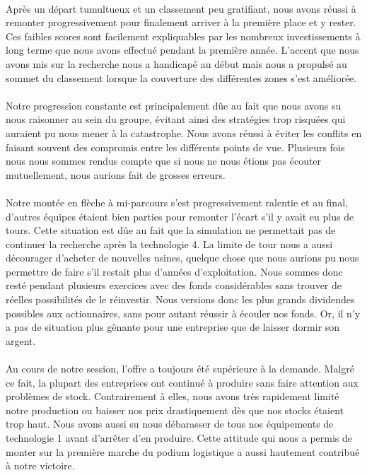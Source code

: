 \paragraph{}
Après un départ tumultueux et un classement peu gratifiant, nous avons réussi
à remonter progressivement pour finalement arriver à la première place et y
rester. Ces faibles scores sont facilement expliquables par les nombreux
investissements à long terme que nous avons effectué pendant la première
année. L'accent que nous avons mis sur la recherche nous a handicapé au début
mais nous a propulsé au sommet du classement lorsque la couverture des
différentes zones s'est améliorée.

\paragraph{}
Notre progression constante est principalement dûe au fait que nous avons su
nous raisonner au sein du groupe, évitant ainsi des stratégies trop risquées
qui auraient pu nous mener à la catastrophe. Nous avons réussi à éviter les
conflits en faisant souvent des compromis entre les différents points de vue.
Plusieurs fois nous nous sommes rendus compte que si nous ne nous étions pas
écouter mutuellement, nous aurions fait de grosses erreurs.

\paragraph{}
Notre montée en flèche à mi-parcours s'est progressivement ralentie et au
final, d'autres équipes étaient bien parties pour remonter l'écart s'il y
avait eu plus de tours. Cette situation est dûe au fait que la simulation ne
permettait pas de continuer la recherche après la technologie 4. La limite de
tour nous a aussi décourager d'acheter de nouvelles usines, quelque chose que
nous aurions pu nous permettre de faire s'il restait plus d'années
d'exploitation. Nous sommes donc resté pendant plusieurs exercices avec des
fonds considérables sans trouver de réelles possibilités de le réinvestir.
Nous versions donc les plus grands dividendes possibles aux actionnaires, sans
pour autant réussir à écouler nos fonds. Or, il n'y a pas de situation plus
gênante pour une entreprise que de laisser dormir son argent.

\paragraph{}
Au cours de notre session, l'offre a toujours été supérieure à la demande.
Malgré ce fait, la plupart des entreprises ont continué à produire sans faire
attention aux problèmes de stock. Contrairement à elles, nous avons très
rapidement limité notre production ou baisser nos prix drastiquement dès que
nos stocks étaient trop haut. Nous avons aussi su nous débarasser de tous nos
équipements de technologie 1 avant d'arrêter d'en produire. Cette attitude
qui nous a permis de monter sur la première marche du podium logistique a
aussi hautement contribué à notre victoire.
